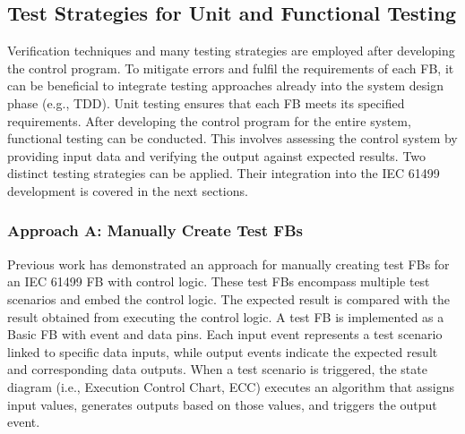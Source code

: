\documentclass[conference]{IEEEtran}
\begin{document}
\subsection{Test Strategies for Unit and Functional Testing}
Verification techniques and many testing strategies are employed after developing the control program. To mitigate errors and fulfil the requirements of each FB, it can be beneficial to integrate testing approaches already into the system design phase (e.g., TDD). Unit testing ensures that each FB meets its specified requirements. After developing the control program for the entire system, functional testing can be conducted. This involves assessing the control system by providing input data and verifying the output against expected results.
Two distinct testing strategies can be applied. Their integration into the IEC 61499 development is covered in the next sections. 

\subsubsection{Approach A: Manually Create Test FBs}
Previous work has demonstrated an approach for manually creating test FBs \cite{Testing_Midhun} for an IEC 61499 FB with control logic. These test FBs encompass multiple test scenarios and embed the control logic. The expected result is compared with the result obtained from executing the control logic. A test FB is implemented as a Basic FB with event and data pins. Each input event represents a test scenario linked to specific data inputs, while output events indicate the expected result and corresponding data outputs. When a test scenario is triggered, the state diagram (i.e., Execution Control Chart, ECC) executes an algorithm that assigns input values, generates outputs based on those values, and triggers the output event.
\end{document}
